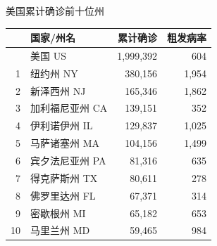 \documentclass[
]{article}
\begin{document}
\begin{table}[H]
      \centering
    \begin{minipage}{.4\linewidth}
    \caption{美国累计确诊前十位州}
    \vspace{-0.5\baselineskip}
      \centering
    \captionsetup{justification=centering} \begin{table}[H]
\centering\begingroup\fontsize{12}{14}\selectfont

\begin{tabular}{rlrr}
\toprule
  & 国家/州名 & 累计确诊 & 粗发病率\\
\midrule
\rowcolor{gray!6}   & 美国 US & 1,999,392 & 604\\
1 & 纽约州 NY & 380,156 & 1,954\\
\rowcolor{gray!6}  2 & 新泽西州 NJ & 165,346 & 1,862\\
3 & 加利福尼亚州 CA & 139,151 & 352\\
\rowcolor{gray!6}  4 & 伊利诺伊州 IL & 129,837 & 1,025\\
5 & 马萨诸塞州 MA & 104,156 & 1,499\\
\rowcolor{gray!6}  6 & 宾夕法尼亚州 PA & 81,316 & 635\\
7 & 得克萨斯州 TX & 80,611 & 278\\
\rowcolor{gray!6}  8 & 佛罗里达州 FL & 67,371 & 314\\
9 & 密歇根州 MI & 65,182 & 653\\
\rowcolor{gray!6}  10 & 马里兰州 MD & 59,465 & 984\\
\bottomrule
\end{tabular}
\endgroup{}
\end{table} \end{minipage}%
    \begin{minipage}{.6\linewidth}
     \caption{美国粗发病率前十位州}
     \vspace{-0.5\baselineskip}
      \centering
    \captionsetup{justification=centering} \begin{table}[H]
\centering\begingroup\fontsize{12}{14}\selectfont


\end{table}
\end{minipage}
\end{table}
\end{document}
